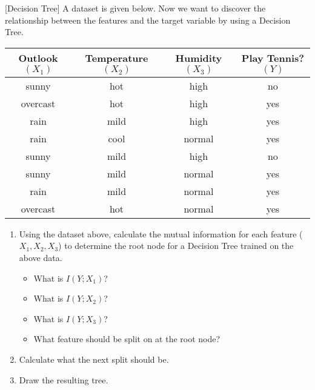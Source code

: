 \item {} [Decision Tree] A dataset is given below. Now we want to discover the relationship between the features and the target variable by using a Decision Tree.
\
\begin{table*}[h]
    \centering
    \begin{tabular}{|c|c|c|c|}
        \hline
        Outlook $\left(X_{1}\right)$ & Temperature $\left(X_{2}\right)$ & Humidity $\left(X_{3}\right)$ & Play Tennis? $(Y)$ \\
        \hline
        sunny & hot & high & no \\
        \hline
        overcast & hot & high & yes \\
        \hline
        rain & mild & high & yes \\
        \hline
        rain & cool & normal & yes \\
        \hline
        sunny & mild & high & no \\
        \hline
        sunny & mild & normal & yes \\
        \hline
        rain & mild & normal & yes \\
        \hline
        overcast & hot & normal & yes \\
        \hline
    \end{tabular}
\end{table*}

\begin{enumerate}
    \item Using the dataset above, calculate the mutual information for each feature ($X_{1}, X_{2}, X_{3}$) to determine the root node for a Decision Tree trained on the above data.
    \begin{itemize}
        \item What is $I\left(Y ; X_{1}\right)$? 
        \item What is $I\left(Y ; X_{2}\right)$? 
        \item What is $I\left(Y ; X_{3}\right)$? \defpoints{3}
        \item What feature should be split on at the root node? 
    \end{itemize}

    \item Calculate what the next split should be. 

    \item Draw the resulting tree. 
\end{enumerate}

\solution






\newpage